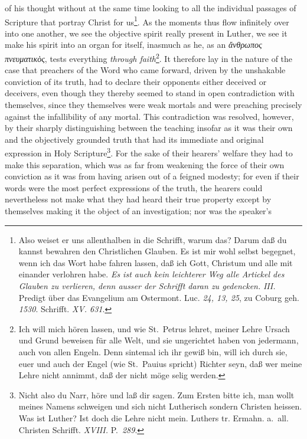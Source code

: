 \documentclass[12pt]{book}
\newcommand{\opage}[1]{\marginnote{\footnotesize\textit{[#1]}}}
\begin{document}
of his thought without at the same time looking to all the individual
passages of Scripture that portray Christ for us\footnote{Also weiset er uns
allenthalben in die Schrifft, warum das? Darum daß du kannst bewahren den
Christlichen Glauben. Es ist mir wohl selbst begegnet, wenn ich das Wort habe
fahren lassen, daß ich Gott, Christum und alle mit einander verlohren habe.
\emph{Es ist auch kein leichterer Weg alle Artickel des Glauben zu verlieren,
denn ausser der Schrifft daran zu gedencken.} \textit{III.} Predigt über das
Evangelium am Ostermont. Luc. \textit{24, 13, 25}, zu Coburg geh.
\textit{1530}. Schrifft. \textit{XV. 631}.}.
\opage{68} \setcounter{footnote}{0}%
As the moments thus flow infinitely over into one another, we see the
objective spirit really present in Luther, we see it make his spirit into an
organ for itself, inasmuch as he, as an \textit{ἄνθρωπος πνευματικὸς}, tests
everything \emph{through faith}\footnote{Ich will mich hören lassen, und wie
St.~Petrus lehret, meiner Lehre Ursach und Grund beweisen für alle Welt, und
sie ungerichtet haben von jedermann, auch von allen Engeln. Denn sintemal ich
ihr gewiß bin, will ich durch sie, euer und auch der Engel (wie St.~Pauius
spricht) Richter seyn, daß wer meine Lehre nicht annimmt, daß der nicht möge
selig werden.}.
It therefore lay in the nature of the case that preachers of the Word who
came forward, driven by the unshakable conviction of its truth, had to
declare their opponents either deceived or deceivers, even though they
thereby seemed to stand in open contradiction with themselves, since they
themselves were weak mortals and were preaching precisely against the
infallibility of any mortal. This contradiction was resolved, however, by
their sharply distinguishing between the teaching insofar as it was their own
and the objectively grounded truth that had its immediate and original
expression in Holy Scripture\footnote{Nicht also du Narr, höre und laß dir
sagen. Zum Ersten bitte ich, man wollt meines Namens schweigen und sich nicht
Lutherisch sondern Christen heissen. Was ist Luther? Ist doch die Lehre nicht
mein. Luthers tr. Ermahn. a.~all. Christen Schrifft. \textit{XVIII.}
P.~\textit{289}.}. For the sake of their hearers' welfare they had to make
this separation, which was as far from weakening the force of their own
conviction as it was from having arisen out of a feigned modesty; for even if
their words were the most perfect expressions of the truth, the hearers could
nevertheless not make what they had heard their true property except by
themselves making it the object of an investigation; nor was the speaker's
\end{document}
